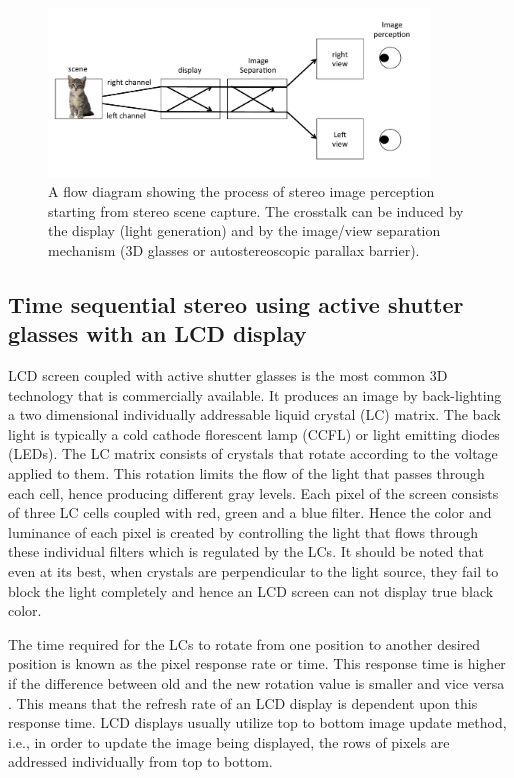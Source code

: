 \begin{figure}
\centering
    \includegraphics[width=0.9\textwidth]{./Template_Figures/ct_flow}
    \caption{A flow diagram showing the process of stereo image perception starting from stereo scene capture. The crosstalk can be induced by the display (light generation) and by the image/view separation mechanism (3D glasses or autostereoscopic parallax barrier).\label{fig:ctflow}}
\end{figure}

\subsection{Time sequential stereo using active shutter glasses with an LCD display}
LCD screen coupled with active shutter glasses is the most common 3D technology that is commercially available. It produces an image by back-lighting a two dimensional individually addressable liquid crystal (LC) matrix. The back light is typically a cold cathode florescent lamp (CCFL) or light emitting diodes (LEDs). The LC matrix consists of crystals that rotate according to the voltage applied to them. This rotation limits the flow of the light that passes through each cell, hence producing different gray levels. Each pixel of the screen consists of three LC cells coupled with red, green and a blue filter. Hence the color and luminance of each pixel is created by controlling the light that flows through these individual filters which is regulated by the LCs. It should be noted that even at its best, when crystals are perpendicular to the light source, they fail to block the light completely and hence an LCD screen can not display true black color.

The time required for the LCs to rotate from one position to another desired position is known as the pixel response rate or time. This response time is higher if the difference between old and the new rotation value is smaller and vice versa \cite{woods2012crosstalk}. This means that the refresh rate of an LCD display is dependent upon this response time. LCD displays usually utilize top to bottom image update method, i.e., in order to update the image being displayed, the rows of pixels are addressed individually from top to bottom.

